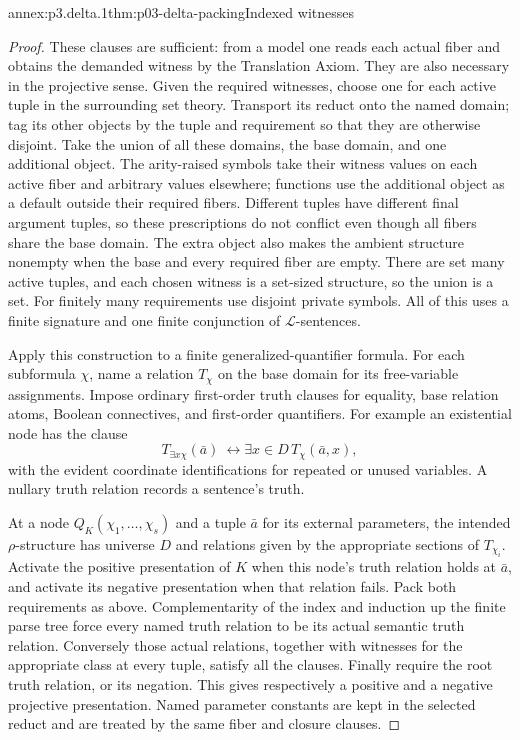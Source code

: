 \begin{annexitem}{annex:p3.delta.1}{thm:p03-delta-packing}{Indexed witnesses}
\begin{proof}
These clauses are sufficient: from a model one reads each actual fiber
and obtains the demanded witness by the Translation Axiom. They are
also necessary in the projective sense. Given the required witnesses,
choose one for each active tuple in the surrounding set theory.
Transport its reduct onto the named domain; tag its other objects by
the tuple and requirement so that they are otherwise disjoint. Take
the union of all these domains, the base domain, and one additional
object. The arity-raised symbols take their witness values on each
active fiber and arbitrary values elsewhere; functions use the
additional object as a default outside their required fibers.
Different tuples have different final argument tuples, so these
prescriptions do not conflict even though all fibers share the base
domain. The extra object also makes the ambient structure nonempty
when the base and every required fiber are empty. There are set many
active tuples, and each chosen witness is a set-sized structure, so
the union is a set. For finitely many requirements use disjoint private
symbols. All of this uses a finite signature and one finite conjunction
of \(\mathcal L\)-sentences.

Apply this construction to a finite generalized-quantifier formula.
For each subformula \(\chi\), name a relation \(T_\chi\) on the
base domain for its free-variable assignments. Impose ordinary
first-order truth clauses for equality, base relation atoms, Boolean
connectives, and first-order quantifiers. For example an existential
node has the clause
\[
 T_{\exists x\chi}(\bar a)\ \longleftrightarrow
 \exists x\in D\,T_\chi(\bar a,x),
\]
with the evident coordinate identifications for repeated or unused
variables. A nullary truth relation records a sentence's truth.

At a node \(Q_K(\chi_1,\ldots,\chi_s)\) and a tuple \(\bar a\)
for its external parameters, the intended \(\rho\)-structure has
universe \(D\) and relations given by the appropriate sections of
\(T_{\chi_i}\). Activate the positive presentation of \(K\) when
this node's truth relation holds at \(\bar a\), and activate its
negative presentation when that relation fails. Pack both requirements
as above. Complementarity of the index and induction up the finite
parse tree force every named truth relation to be its actual semantic
truth relation. Conversely those actual relations, together with
witnesses for the appropriate class at every tuple, satisfy all the
clauses. Finally require the root truth relation, or its negation.
This gives respectively a positive and a negative projective
presentation. Named parameter constants are kept in the selected
reduct and are treated by the same fiber and closure clauses.
\end{proof}
\end{annexitem}

